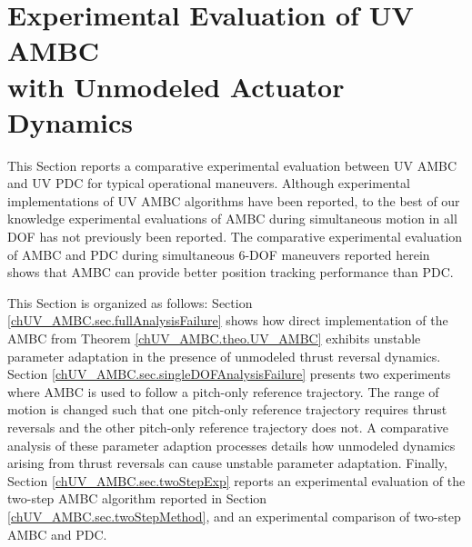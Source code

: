 \section{Experimental Evaluation of \ac{UV} \ac{AMBC} \\
            with Unmodeled Actuator Dynamics}
\label{chUV_AMBC.sec.unmodeledActDyn}



%
This Section reports a comparative experimental evaluation between
\ac{UV} \ac{AMBC} and \ac{UV} \ac{PDC} for typical operational
maneuvers.
%
Although experimental implementations of \ac{UV} \ac{AMBC} algorithms
have been reported\cite{yoerger.icra91, yuhICRA1999,
  antonelli&sarkar.cst2001, smallwood2004JOE, maalouf2013pd,
  zhao2005experimental}, to the best of our knowledge experimental
evaluations of \ac{AMBC} during simultaneous motion in all \ac{DOF}
has not previously been reported.
%
The comparative experimental evaluation of \ac{AMBC} and \ac{PDC}
during simultaneous 6-\ac{DOF} maneuvers reported herein shows that
\ac{AMBC} can provide better position tracking performance than
\ac{PDC}.


This Section is organized as follows:
%
%
Section \ref{chUV_AMBC.sec.fullAnalysisFailure} shows how direct
implementation of the \ac{AMBC} from Theorem
\ref{chUV_AMBC.theo.UV_AMBC} exhibits unstable parameter adaptation
in the presence of unmodeled thrust reversal dynamics.
%
Section \ref{chUV_AMBC.sec.singleDOFAnalysisFailure} presents two
experiments where \ac{AMBC} is used to follow a pitch-only reference
trajectory.
%
The range of motion is changed such that one pitch-only reference
trajectory requires thrust reversals and the other pitch-only
reference trajectory does not.
%
A comparative analysis of these parameter adaption processes details
how unmodeled dynamics arising from thrust reversals can cause
unstable parameter adaptation.
%
Finally, Section \ref{chUV_AMBC.sec.twoStepExp} reports an
experimental evaluation of the two-step \ac{AMBC} algorithm reported
in Section \ref{chUV_AMBC.sec.twoStepMethod}, and an experimental
comparison of two-step \ac{AMBC} and \ac{PDC}.







